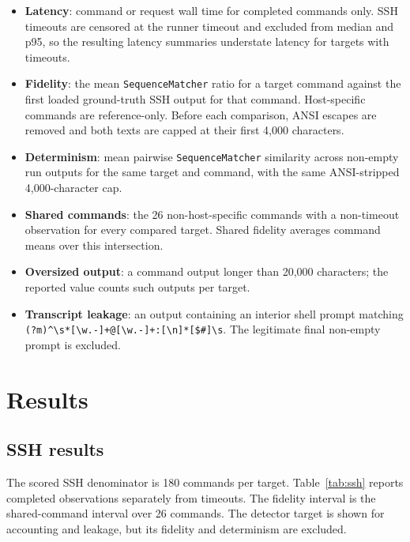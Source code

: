\documentclass[a4paper,11pt]{article}
\begin{document}
\begin{itemize}[leftmargin=*]
\item \textbf{Latency}: command or request wall time for completed commands
only. SSH timeouts are censored at the runner timeout and excluded from
median and p95, so the resulting latency summaries understate latency for
targets with timeouts.
\item \textbf{Fidelity}: the mean \texttt{SequenceMatcher} ratio for a target
command against the first loaded ground-truth SSH output for that command.
Host-specific commands are reference-only. Before each comparison, ANSI
escapes are removed and both texts are capped at their first 4,000 characters.
\item \textbf{Determinism}: mean pairwise \texttt{SequenceMatcher} similarity
across non-empty run outputs for the same target and command, with the same
ANSI-stripped 4,000-character cap.
\item \textbf{Shared commands}: the 26 non-host-specific commands with a
non-timeout observation for every compared target. Shared fidelity averages
command means over this intersection.
\item \textbf{Oversized output}: a command output longer than 20,000
characters; the reported value counts such outputs per target.
\item \textbf{Transcript leakage}: an output containing an interior shell
prompt matching
\texttt{(?m)\textasciicircum\textbackslash s*[\textbackslash w.-]+@[\textbackslash w.-]+:[\textbackslash n]*[\$\#]\textbackslash s}.
The legitimate final non-empty prompt is excluded.
\end{itemize}

\section{Results}

\subsection{SSH results}

The scored SSH denominator is 180 commands per target. Table~\ref{tab:ssh}
reports completed observations separately from timeouts. The fidelity interval
is the shared-command interval over 26 commands. The detector target is shown
for accounting and leakage, but its fidelity and determinism are excluded.
\end{document}
